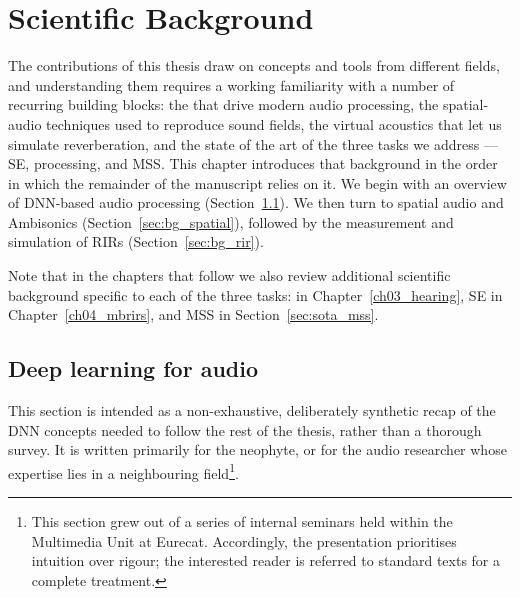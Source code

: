 
\chapter{Scientific Background}
\label{ch02_sota}

The contributions of this thesis draw on concepts and tools from different fields, and understanding them requires a working
familiarity with a number of recurring building blocks: the  that drive modern audio processing, the spatial-audio techniques
used to reproduce sound fields, the virtual acoustics that
let us simulate reverberation, and the state of the art of the
three tasks we address --- \acrshort{SE},  processing,
and \acrshort{MSS}. This chapter introduces that background in
the order in which the remainder of the manuscript relies on it. We begin
with an overview of \acrshort{DNN}-based audio processing
(Section~\ref{sec:bg_dl}). We then turn to spatial audio and Ambisonics
(Section~\ref{sec:bg_spatial}), followed by the measurement and simulation of \acrshort{RIR}s
(Section~\ref{sec:bg_rir}). 

Note that in the chapters that follow we also review additional scientific background
specific to each of the three tasks: 
in Chapter~\ref{ch03_hearing}, \acrfull{SE} in Chapter~\ref{ch04_mbrirs},
and \acrfull{MSS} in Section~\ref{sec:sota_mss}.






\section{Deep learning for audio}
\label{sec:bg_dl}


This section is intended as a non-exhaustive, deliberately synthetic recap
of the \acrshort{DNN} concepts needed to follow the rest of the thesis,
rather than a thorough survey. It is written primarily for the neophyte,
or for the audio researcher whose expertise lies in a neighbouring field\footnote{This section grew out of a series of internal seminars held within the
Multimedia Unit at Eurecat. Accordingly, the presentation prioritises intuition over rigour; the
interested reader is referred to standard texts for a complete treatment.}.


